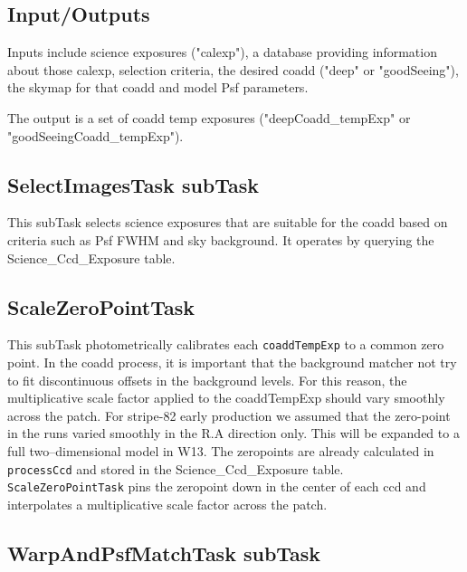 \documentclass[12pt]{article}
\begin{document}
\subsection{Input/Outputs}

Inputs include science exposures ("calexp"), a database providing information about
those calexp, selection criteria, the desired coadd ("deep" or "goodSeeing"),
the skymap for that coadd and model Psf parameters.

The output is a set of coadd temp exposures ("deepCoadd\_tempExp" or "goodSeeingCoadd\_tempExp").

\subsection{SelectImagesTask subTask} 

This subTask selects science exposures that are suitable for the coadd
based on criteria such as Psf FWHM and sky background. It operates by
querying the Science\_Ccd\_Exposure table.

\subsection{ScaleZeroPointTask} 

This subTask  photometrically calibrates each {\tt coaddTempExp} to a common zero point. 
%
In the coadd process, it is important that the background matcher not try to fit discontinuous offsets in the background levels. For this reason, the multiplicative scale factor applied to the coaddTempExp should vary smoothly across the patch. For stripe-82 early production we assumed that the zero-point in the runs varied smoothly in the R.A direction only.  This will be expanded to a full two--dimensional model in W13.  The zeropoints are already calculated in {\tt processCcd} and stored in the Science\_Ccd\_Exposure table. {\tt ScaleZeroPointTask} pins the zeropoint down in the center of each ccd and interpolates a multiplicative scale factor across the patch. 

\subsection{WarpAndPsfMatchTask subTask} 
\end{document}

